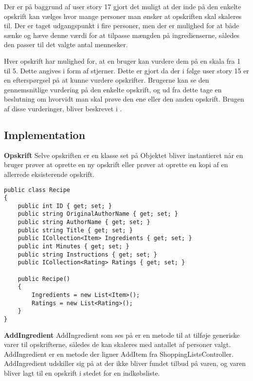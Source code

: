 Der er på baggrund af user story 17 gjort det muligt at der inde på den enkelte opskrift kan vælges hvor mange personer man ønsker at opskriften skal skaleres til.
Der er taget udgangspunkt i fire personer, men der er mulighed for at både sænke og hæve denne værdi for at tilpasse mængden på ingredienserne, således den passer til det valgte antal mennesker.


Hver opskrift har mulighed for, at en bruger kan vurdere dem på en skala fra 1 til 5.
Dette angives i form af stjerner.
Dette er gjort da der i følge user story 15 er en efterspørgsel på at kunne vurdere opskrifter.
Brugerne kan se den gennemsnitlige vurdering på den enkelte opskrift, og ud fra dette tage en beslutning om hvorvidt man skal prøve den ene eller den anden opskrift.
Brugen af disse vurderinger, bliver beskrevet i .


\subsection{Implementation}
\textbf{Opskrift}
Selve opskriften er en klasse set på  Objektet bliver instantieret når en bruger prøver at oprette en ny opskrift eller prøver at oprette en kopi af en allerrede eksisterende opskrift.


\begin{lstlisting}[caption="Klassen Recipe som svarer til objektet\, opskrift"]
public class Recipe
{
    public int ID { get; set; }
    public string OriginalAuthorName { get; set; }
    public string AuthorName { get; set; }
    public string Title { get; set; }
    public ICollection<Item> Ingredients { get; set; }
    public int Minutes { get; set; }
    public string Instructions { get; set; }
    public ICollection<Rating> Ratings { get; set; }

    public Recipe()
    {
        Ingredients = new List<Item>();
        Ratings = new List<Rating>();
    }
}
\end{lstlisting}

\textbf{AddIngredient}
AddIngredient som ses på er en metode til at tilføje generiske varer til opskrifterne, således de kan skaleres med antallet af personer valgt. AddIngredient er en metode der ligner AddItem fra ShoppingListsController. AddIngredient udskiller sig på at der ikke bliver fundet tilbud på varen, og varen bliver lagt til en opskrift i stedet for en indkøbsliste.



